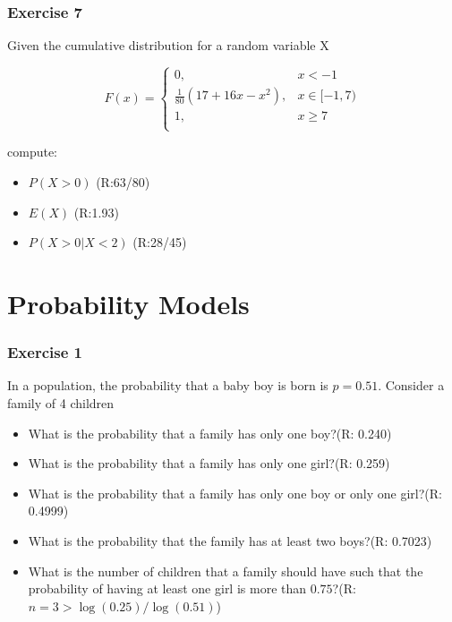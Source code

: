 \documentclass[
]{book}
\providecommand{\tightlist}{%
  \setlength{\itemsep}{0pt}\setlength{\parskip}{0pt}}
\begin{document}
\hypertarget{exercise-7}{%
\subsubsection{Exercise 7}\label{exercise-7}}

Given the cumulative distribution for a random variable X

\[
    F(x)= 
\begin{cases}
0, & x  < -1 \\
\frac{1}{80}(17+16x-x^2),& x \in [-1,7)\\
1,& x \geq 7\\
\end{cases}
\]

compute:

\begin{itemize}
\tightlist
\item
  \(P(X>0)\) (R:63/80)
\item
  \(E(X)\) (R:1.93)
\item
  \(P(X>0|X<2)\) (R:28/45)
\end{itemize}

\hypertarget{probability-models}{%
\section{Probability Models}\label{probability-models}}

\hypertarget{exercise-1-4}{%
\subsubsection{Exercise 1}\label{exercise-1-4}}

In a population, the probability that a baby boy is born is \(p=0.51\). Consider a family of 4 children

\begin{itemize}
\tightlist
\item
  What is the probability that a family has only one boy?(R: 0.240)
\item
  What is the probability that a family has only one girl?(R: 0.259)
\item
  What is the probability that a family has only one boy or only one girl?(R: 0.4999)
\item
  What is the probability that the family has at least two boys?(R: 0.7023)
\item
  What is the number of children that a family should have such that the probability of having at least one girl is more than \(0.75\)?(R:\(n=3>\log(0.25)/\log(0.51)\))
\end{itemize}
\end{document}
